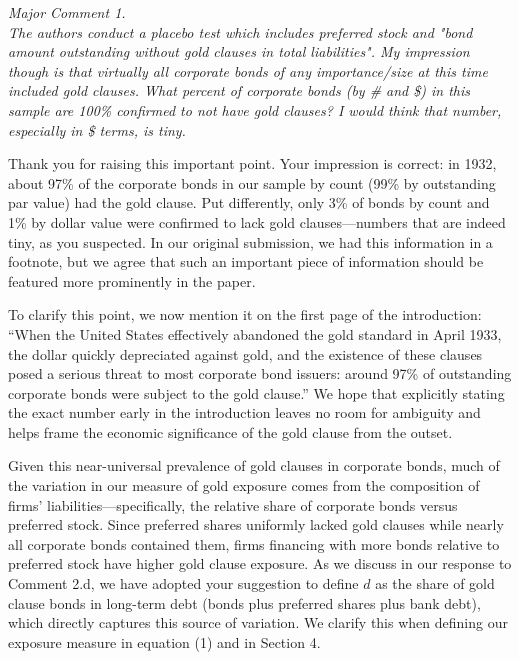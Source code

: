 \noindent \textit{\textcolor{red!60!black}{
Major Comment 1.\\ 
The authors conduct a placebo test which includes preferred stock and "bond amount outstanding without gold clauses in total liabilities". My impression though is that virtually all corporate bonds of any importance/size at this time included gold clauses. What percent of corporate bonds (by \# and \$) in this sample are 100\% confirmed to not have gold clauses? I would think that number, especially in \$ terms, is tiny.
}}

\bigskip

\noindent Thank you for raising this important point. Your impression is correct: in 1932, about 97\% of the corporate bonds in our sample by count (99\% by outstanding par value) had the gold clause. Put differently, only 3\% of bonds by count and 1\% by dollar value were confirmed to lack gold clauses---numbers that are indeed tiny, as you suspected. In our original submission, we had this information in a footnote, but we agree that such an important piece of information should be featured more prominently in the paper.

To clarify this point, we now mention it on the first page of the introduction: ``When the United States effectively abandoned the gold standard in April 1933, the dollar quickly depreciated against gold, and the existence of these clauses posed a serious threat to most corporate bond issuers: around 97\% of outstanding corporate bonds were subject to the gold clause.'' We hope that explicitly stating the exact number early in the introduction leaves no room for ambiguity and helps frame the economic significance of the gold clause from the outset.

Given this near-universal prevalence of gold clauses in corporate bonds, much of the variation in our measure of gold exposure comes from the composition of firms' liabilities---specifically, the relative share of corporate bonds versus preferred stock. Since preferred shares uniformly lacked gold clauses while nearly all corporate bonds contained them, firms financing with more bonds relative to preferred stock have higher gold clause exposure. As we discuss in our response to Comment 2.d, we have adopted your suggestion to define $d$ as the share of gold clause bonds in long-term debt (bonds plus preferred shares plus bank debt), which directly captures this source of variation. We clarify this when defining our exposure measure in equation (1) and in Section 4.

